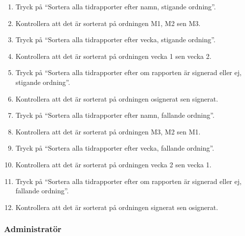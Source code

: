 \documentclass[a4paper]{article}
\begin{document}
\begin{ST}
\begin{enumerate}
\item Tryck på ``Sortera alla tidrapporter efter namn, stigande ordning''.
\item Kontrollera att det är sorterat på ordningen M1, M2 sen M3.
\item Tryck på ``Sortera alla tidrapporter efter vecka, stigande ordning''.
\item Kontrollera att det är sorterat på ordningen vecka 1 sen vecka 2.
\item Tryck på ``Sortera alla tidrapporter efter om rapporten är signerad eller ej, stigande ordning''.
\item Kontrollera att det är sorterat på ordningen osignerat sen signerat.
\item Tryck på ``Sortera alla tidrapporter efter namn, fallande ordning''.
\item Kontrollera att det är sorterat på ordningen M3, M2 sen M1.
\item Tryck på ``Sortera alla tidrapporter efter vecka, fallande ordning''.
\item Kontrollera att det är sorterat på ordningen vecka 2 sen vecka 1.
\item Tryck på ``Sortera alla tidrapporter efter om rapporten är signerad eller ej, fallande ordning''.
\item Kontrollera att det är sorterat på ordningen signerat sen osignerat.
\end{enumerate}

\end{ST}

\subsubsection{Administratör}
\end{document}
